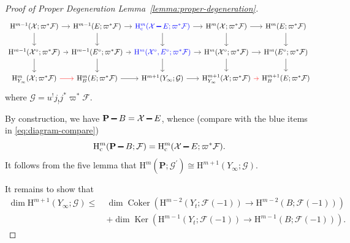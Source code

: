 \documentclass[english]{smfart}
\renewcommand{\setminus}{\mathbin{\rule[0.2em]{0.67em}{0.12em}}}%
\renewcommand{\mathbb}{\mathbf}
\renewcommand{\leq}{\leqslant}
\theoremstyle{remark}
\theoremstyle{plain}
\theoremstyle{definition}
\numberwithin{equation}{remark}
\theoremstyle{void}
\begin{document}
\begin{proof}[Proof of Proper Degeneration Lemma~\ref{lemma:proper-degeneration}]
\begin{equation*}
\begin{tikzcd}[column sep=7pt]
\mathrm{H}^{m-1}(\mathcal{X};\varpi^{\ast}\mathcal{F}) \ar[r] \ar[d] & \mathrm{H}^{m-1}(E;\varpi^{\ast}\mathcal{F}) \ar[d] \ar[r]
&  \mathcolor{blue}{\mathrm{H}^m_{\mathrm{c}}(\mathcal{X}\setminus E;\varpi^{\ast}\mathcal{F})} \ar[r] \ar[d] &
\mathrm{H}^m(\mathcal{X};\varpi^{\ast}\mathcal{F}) \ar[d] \ar[r] & \mathrm{H}^m(E;\varpi^{\ast}\mathcal{F}) \ar[d]\\
\mathrm{H}^{m-1}(\mathcal{X}^{\circ};\varpi^{\ast}\mathcal{F}) \ar[r] \ar[d] & \mathrm{H}^{m-1}(E^{\circ};\varpi^{\ast}\mathcal{F}) \ar[r] \ar[d]
& \mathcolor{blue}{\mathrm{H}^m(\mathcal{X}^{\circ},E^{\circ};\varpi^{\ast}\mathcal{F})} \ar[r] \ar[d]&
\mathrm{H}^m(\mathcal{X}^{\circ};\varpi^{\ast}\mathcal{F}) \ar[r] \ar[d] & \mathrm{H}^{m}(E^{\circ};\varpi^{\ast}\mathcal{F}) \ar[d]\\
\mathrm{H}^m_{Y_{\infty}}(\mathcal{X};\varpi^{\ast}\mathcal{F}) \ar[r,red] &
\mathrm{H}^m_B(E;\varpi^{\ast}\mathcal{F}) \ar[r] & \mathrm{H}^{m+1}(Y_{\infty};\mathcal{G}) \ar[r] &
\mathrm{H}^{m+1}_{Y_{\infty}}(\mathcal{X};\varpi^{\ast}\mathcal{F}) \ar[r,red] & \mathrm{H}^{m+1}_B(E;\varpi^{\ast}\mathcal{F})
\end{tikzcd}
\end{equation*}
where \(\mathcal{G}=u^{!}j_{!}j^{\ast}\varpi^{\ast}\mathcal{F}\).

By construction, we have \(\mathbb{P}\setminus B = \mathcal{X}\setminus E\),
whence (compare with the blue items in \eqref{eq:diagram-compare})
\begin{equation*}
\mathrm{H}^m_{\mathrm{c}}(\mathbb{P}\setminus B;\mathcal{F}) =
\mathrm{H}^m_{\mathrm{c}}(\mathcal{X}\setminus E;\varpi^{\ast}\mathcal{F}).
\end{equation*}
It follows from the five lemma that
\(\mathrm{H}^{m}(\mathbb{P};\mathcal{G}^{\prime})\cong\mathrm{H}^{m+1}(Y_{\infty};\mathcal{G})\).

It remains to show that
\begin{align}\label{eq:key-inequality}
  \dim \mathrm{H}^{m+1}(Y_{\infty};\mathcal{G}) \leq \
  &\dim \operatorname{Coker}(\mathrm{H}^{m-2}(Y_{t};\mathcal{F}(-1)) \to \mathrm{H}^{m-2}(B;\mathcal{F}(-1))) \\
  &+ \dim \operatorname{Ker}(\mathrm{H}^{m-1}(Y_{t};\mathcal{F}(-1)) \to \mathrm{H}^{m-1}(B;\mathcal{F}(-1))).\nonumber
\end{align}


\end{proof}
\end{document}
